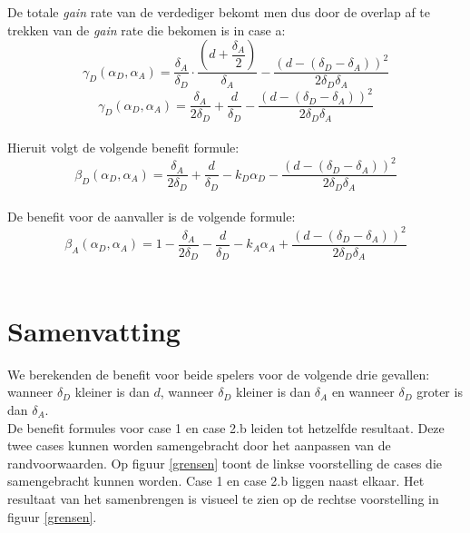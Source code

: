 \documentclass[master=cws, masteroption=vs,english]{kulemt}
\begin{document}
\begin{abstract*}
De totale \textit{gain} rate van de verdediger bekomt men dus door de overlap af te trekken van de \textit{gain} rate die bekomen is in case a:
 \begin{equation}\label{first}
\gamma_{D}(\alpha_{D},\alpha_{A}) = \dfrac{\delta_{A}}{\delta_{D}} \cdot \dfrac{(d+\dfrac{\delta_{A}}{2})}{\delta_{A}} - \dfrac{(d - (\delta_{D} - \delta_{A}))^{2}}{2 \delta_{D} \delta_{A}}
\end{equation}
\begin{equation}\label{first}
\gamma_{D}(\alpha_{D},\alpha_{A}) = \dfrac{\delta_{A}}{2\delta_{D}} + \dfrac{d}{\delta_{D}} - \dfrac{(d - (\delta_{D} - \delta_{A}))^{2}}{2 \delta_{D} \delta_{A}}
\end{equation}\\
Hieruit volgt de volgende benefit formule:
\begin{equation}\label{first}
\beta_{D}(\alpha_{D},\alpha_{A}) = \dfrac{\delta_{A}}{2\delta_{D}} + \dfrac{d}{\delta_{D}} - k_{D} \alpha_{D} - \dfrac{(d - (\delta_{D} - \delta_{A}))^{2}}{2 \delta_{D} \delta_{A}}
\end{equation}\\
 
De benefit voor de aanvaller is de volgende formule:
\begin{equation}\label{first}
\beta_{A}(\alpha_{D},\alpha_{A}) = 1 -\dfrac{\delta_{A}}{2\delta_{D}} - \dfrac{d}{\delta_{D}} - k_{A} \alpha_{A} + \dfrac{(d - (\delta_{D} - \delta_{A}))^{2}}{2 \delta_{D} \delta_{A}}
\end{equation}\\

\section*{Samenvatting}
We berekenden de benefit voor beide spelers voor de volgende drie gevallen: wanneer $ \delta_ {D} $ kleiner is dan $ d $, wanneer $ \delta_ {D} $ kleiner is dan $ \delta_ {A} $ en wanneer $\delta_{D}$ groter is dan $ \delta_ {A} $. \\
De benefit formules voor case 1 en case 2.b leiden tot hetzelfde resultaat. Deze twee cases kunnen worden samengebracht door het aanpassen van de randvoorwaarden. Op figuur \ref{grensen} toont de linkse voorstelling de cases die samengebracht kunnen worden. Case 1 en case 2.b liggen naast elkaar. Het resultaat van het samenbrengen is visueel te zien op de rechtse voorstelling in figuur \ref{grensen}.\\


\end{abstract*}
\end{document}
